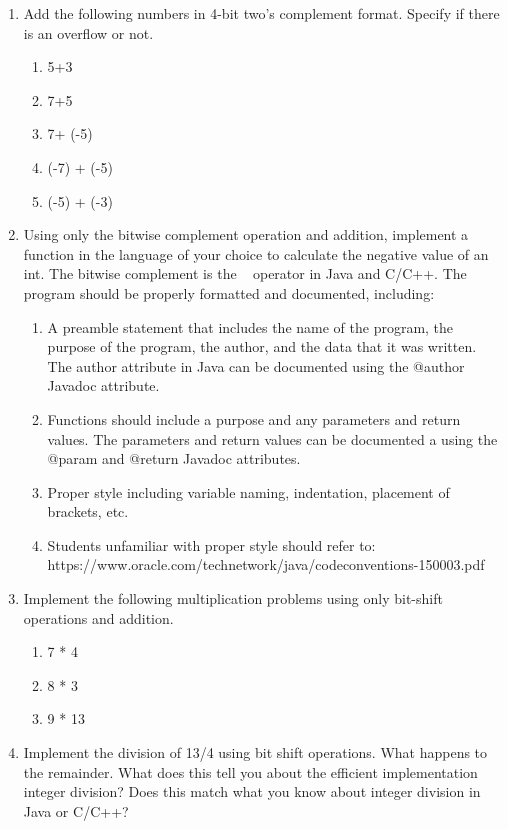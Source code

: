 \documentclass[12pt]{article}
\begin{document}
\begin{enumerate}
    \item Add the following numbers in 4-bit two’s complement format. Specify if there is an overflow or not.
    \begin{enumerate}
      \item 5+3
      \item 7+5
      \item 7+ (-5)
      \item (-7) + (-5)
      \item (-5) + (-3)
    \end{enumerate}

    \item Using only the bitwise complement operation and addition, implement a function in the language of your choice to calculate the negative value of an int. The bitwise complement is the ~ operator in Java and C/C++. The program should be properly formatted and documented, including:
    \begin{enumerate}
      \item A preamble statement that includes the name of the program, the purpose of the program, the author, and the data that it was written. The author attribute in Java can be documented using the @author Javadoc attribute.
      \item Functions should include a purpose and any parameters and return values. The parameters and return values can be documented a using the @param and @return Javadoc attributes.
      \item Proper style including variable naming, indentation, placement of brackets, etc.
      \item Students unfamiliar with proper style should refer to: https://www.oracle.com/technetwork/java/codeconventions-150003.pdf
    \end{enumerate}

    \item Implement the following multiplication problems using only bit-shift operations and addition.
    \begin{enumerate}
      \item 7 * 4
      \item 8 * 3
      \item 9 * 13
    \end{enumerate}

    \item Implement the division of 13/4 using bit shift operations. What happens to the remainder. What does this tell you about the efficient implementation integer division? Does this match what you know about integer division in Java or C/C++?


\end{enumerate}
\end{document}
